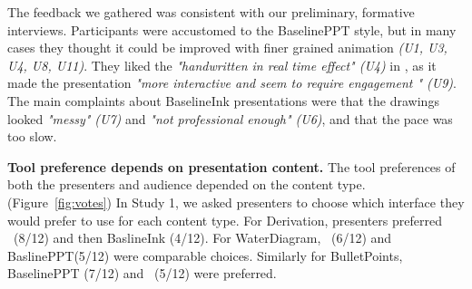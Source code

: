 The feedback we gathered was consistent with our preliminary, formative interviews. Participants were accustomed to the BaselinePPT style, but in many cases they thought it could be improved with finer grained animation \textit{(U1, U3, U4, U8, U11)}. They liked the \textit{"handwritten in real time effect" (U4)}   in \interface, as it made the presentation \textit{"more interactive and seem to require engagement " (U9)}. The main complaints about BaselineInk presentations were that the drawings looked \textit{"messy" (U7)} and \textit{"not professional enough" (U6)}, and that the pace was too slow.

\textbf{Tool preference depends on presentation content.}
The tool preferences of both the presenters and audience depended on the content type. (Figure~\ref{fig:votes})
%
In Study 1, we asked presenters to choose which interface they would prefer to use for each content type.
%
For Derivation, presenters preferred  \interface\ (8/12) and then BaslineInk (4/12). For WaterDiagram, \interface\ (6/12) and BaslinePPT(5/12) were comparable choices. Similarly for BulletPoints, BaselinePPT (7/12) and \interface\ (5/12) were preferred.
%

